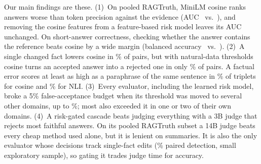 Our main findings are these. (1)~On pooled RAGTruth, MiniLM cosine ranks answers worse than token precision against the evidence (AUC \PoolCosAuc\ vs.\ \PoolTokPrecAuc), and removing the cosine features from a feature-based risk model leaves its AUC unchanged. On short-answer correctness, checking whether the answer contains the reference beats cosine by a wide margin (balanced accuracy \EvContainBacc\ vs.\ \EvCosBacc). (2)~A single changed fact lowers cosine in \CfCosDrop\% of pairs, but with natural-data thresholds cosine turns an accepted answer into a rejected one in only \CfCosDetect\% of pairs. A factual error scores at least as high as a paraphrase of the same sentence in \CfCosInv\% of triplets for cosine and \CfNliInv\% for NLI. (3)~Every evaluator, including the learned risk model, broke a 5\% false-acceptance budget when its threshold was moved to several other domains, up to \TrRiskOffMax\%; most also exceeded it in one or two of their own domains. (4)~A risk-gated cascade beats judging everything with a 3B judge that rejects most faithful answers. On its pooled RAGTruth subset a 14B judge beats every cheap method used alone, but it is lenient on summaries. It is also the only evaluator whose decisions track single-fact edits (\CfJStrongDetect\% paired detection, small exploratory sample), so gating it trades judge time for accuracy.
